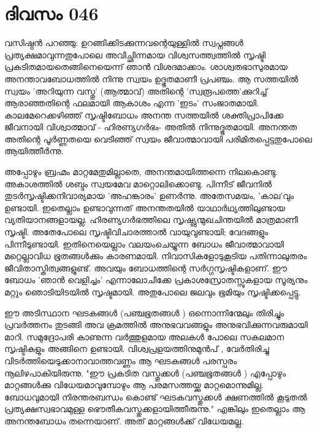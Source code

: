  
\section{ദിവസം 046}


വസിഷ്ഠന്‍ പറഞ്ഞു: ഉറങ്ങിക്കിടക്കുന്നവന്റെയുള്ളില്‍ സ്വപ്നങ്ങള്‍ പ്രത്യക്ഷമാവുന്നതുപോലെ അവിച്ഛിന്നമായ വിശ്വസത്ത്വത്തില്‍ സൃഷ്ടി പ്രകടിതമായതെങ്ങിനെയെന്ന് ഞാന്‍ വിശദമാക്കാം. ശാശ്വതഭാസുരമായ അനന്താവബോധത്തില്‍ നിന്നു സ്വയം ഉദ്ഭൂതമാണീ പ്രപഞ്ചം. ആ സത്തയില്‍ സ്വയം 'അറിയുന്ന വസ്തു' (ആത്മാവ്‌) അതിന്റെ 'സ്വരൂപത്തെ'ക്കുറിച്ച്‌ ആരാഞ്ഞതിന്റെ ഫലമായി ആകാശം എന്ന 'ഇടം' സംജാതമായി. കാലമേറെക്കഴിഞ്ഞ്‌ സൃഷ്ടിബോധം അനന്ത സത്തയില്‍ ശക്തിപ്രാപിക്കേ ജീവനായി വിശ്വാത്മാവ്‌ - ഹിരണ്യഗര്‍ഭം- അതില്‍ നിന്നുദ്ഭൂതമായി. അനന്തത അതിന്റെ പൂര്‍ണ്ണതയെ വെടിഞ്ഞ്‌ സ്വയം ജീവാത്മാവായി പരിമിതപ്പെട്ടതുപോലെ ആയിത്തീര്‍ന്നു.

അപ്പോഴും ബ്രഹ്മം മാറ്റമേതുമില്ലാതെ, അനന്തമായിത്തന്നെ നിലകൊണ്ടു. അകാശത്തില്‍ ശബ്ദം സ്വയമേവ മാറ്റൊലിക്കൊണ്ടു. പിന്നീട്‌ ജീവനില്‍ തുടര്‍സൃഷ്ടിക്കനിവാര്യമായ 'അഹങ്കാരം' ഉണര്‍ന്നു. അതേസമയം, 'കാല'വും ഉണ്ടായി. ഇതെല്ലാം ഉണ്ടാവുന്നത്‌ അനന്തതയില്‍ യാഥാർഥ്യത്തിലുണ്ടായ വ്യതിയാനങ്ങളായല്ല. ഹിരണ്യഗര്‍ഭത്തിലെ സൃഷ്ട്യുന്മുഖചിന്തയില്‍ മാത്രമാണീ സൃഷ്ടി. അതേപോലെ സൃഷ്ടിവിചാരത്താല്‍ വായുവുണ്ടായി; വേദങ്ങളും പിന്നീടുണ്ടായി. ഇതിനെയെല്ലാം വലയംചെയ്യുന്ന ബോധം ജീവാത്മാവായി മറ്റെല്ലാവിധ ഭൂതങ്ങള്‍ക്കും കാരണമായി. നിവാസികളോടുകൂടിയ പതിന്നാലുതരം ജീവിതാസ്തിത്വങ്ങളുണ്ട്‌. അവയും ബോധത്തിന്റെ സര്‍ഗ്ഗസൃഷ്ടികളാണ്‌. ഈ ബോധം 'ഞാന്‍ വെളിച്ചം' എന്നാലോചിക്കേ പ്രകാശസ്രോതസ്സുകളായ സൂര്യനും മറ്റും ഞൊടിയിടയില്‍ സൃഷ്ടമായി. അതുപോലെ ജലവും ഭൂമിയും സൃഷ്ടിക്കപ്പെട്ടു. 

ഈ അടിസ്ഥാന ഘടകങ്ങള്‍ (പഞ്ചഭൂതങ്ങള്‍ ) ഒന്നൊന്നിന്മേലും തിരിച്ചും പ്രവര്‍ത്തനം തുടങ്ങി അവ ക്രമത്തിൽ അനുഭവവങ്ങളും അനുഭവിക്കുന്നവരുമായി  മാറി. സമുദ്രോപരി കാണുന്ന വര്‍ത്തുളമായ അലകള്‍ പോലെ സകലമാന സൃഷ്ടികളും  അങ്ങിനെ  ഉണ്ടായി. വിശ്വപ്രളയത്തിനുമുന്‍പ്‌ , വേര്‍തിരിച്ചു വിടര്‍ത്തിയെടുക്കാനാവാത്തവണ്ണം ആ ഘടകങ്ങള്‍ പരസ്പരം നൂലിഴപാകിയിരുന്നു. "ഈ പ്രകടിത വസ്തുക്കള്‍ (പഞ്ചഭൂതങ്ങള്‍ ) എപ്പോഴും മാറ്റങ്ങള്‍ക്കു വിധേയമാവുമ്പോഴും ആ പരമസത്തയ്ക്കു മാറ്റമൊന്നുമില്ല. ബോധവുമായി നിരന്തരബന്ധം കൊണ്ട്‌ ഘടകവസ്തുക്കള്‍ ക്ഷണത്തില്‍ കൂടുതല്‍ പ്രത്യക്ഷസ്വഭാവമുള്ള ഭൌതീകവസ്തുക്കളായിത്തീരുന്നു." എങ്കിലും ഇതെല്ലാം ആ അനന്തബോധം തന്നെയാണ്‌. അത്‌ മാറ്റങ്ങള്‍ക്ക്‌ വിധേയമല്ല. 

